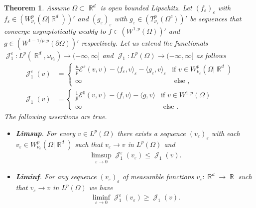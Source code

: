 \documentclass[12pt, reqno]{amsart}%
\theoremstyle{plain}  %
\newtheorem{theorem}{Theorem}[section]
\theoremstyle{definition}  %
\numberwithin{equation}{section}
\DeclareMathOperator{\cJ}{\mathcal{J}}
\DeclareMathOperator{\R}{\mathbb{R}}
\newcommand{\eps}{\varepsilon}
\newcommand{\WnuOmRa}{W^p_{\nu_\eps}(\Omega|\R^d )}
\begin{document}
\begin{theorem}\label{thm:gamma-conv-J}
Assume $\Omega\subset \R^d$ is open bounded Lipschitz.  Let $ (f_\eps)_\eps$ with  $f_\eps\in  (W^{p}_{\nu_\eps}(\Omega|\R^d))'$ and $ (g_\eps)_\eps$ with $g_\eps\in  (T^{p}_{\nu_\eps}(\Omega^c))'$  be sequences that converge asymptotically weakly to  $f\in (W^{1,p}(\Omega))'$ and
$g\in( W^{1-1/p ,p}(\partial\Omega))'$ respectively. Let us extend the functionals $\cJ^\eps_1: L^p(\R^d, \omega_{\nu_\eps})\to (-\infty,\infty]$  and $\cJ_1: L^p(\Omega)\to (-\infty,\infty]$ as follows
\begin{align*}
\cJ^\eps_1 (v)
&=\begin{cases}
\tfrac{\mu}{p} \mathcal{E}^\eps(v,v)  -\langle f_\eps, v\rangle_\eps - \langle g_\eps, v\rangle_\eps & \text{if $v\in \WnuOmRa$}\\
\infty &\text{ else },
\end{cases}\\
\cJ_1(v) &=\begin{cases}
\tfrac{1}{p} \mathcal{E}^0(v,v)  -\langle f, v\rangle- \langle g, v\rangle & \text{if $v\in W^{1,p}(\Omega)$}\\
\infty &\text{ else }.
\end{cases}
\end{align*}
The following assertions are true.
\begin{itemize}
\item \textbf{Limsup}.  For every  $v\in L^p(\Omega)$ there exists a sequence $(v_\eps)_\eps$ with each $v_\eps\in \WnuOmRa$ such that  $v_\eps\to v$ in $L^p(\Omega)$  and
\begin{align*}
\limsup_{\eps\to0} \cJ^\eps_1(v_\eps)\leq \cJ_1(v).
\end{align*}
\item \textbf{Liminf}. For any sequence $(v_\eps)_\eps$  of measurable  functions $v_\eps:\R^d\to\R$ such that $v_\eps\to v$ in $L^p(\Omega)$ we have
\begin{align*}
\liminf_{\eps\to0} \cJ^\eps_1(v_\eps)\geq \cJ_1(v).
\end{align*}
\end{itemize}
\end{theorem}
\end{document}
